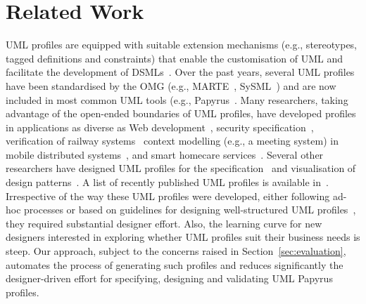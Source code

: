\section{Related Work} 
\label{sec:related}

UML profiles are equipped with suitable extension mechanisms (e.g., 
stereotypes, tagged 
definitions and constraints) that enable the customisation of UML  and 
facilitate the development of DSMLs~\cite{UML2015OMG}. 
Over the past years, several UML profiles have been standardised by the OMG 
(e.g., MARTE~\cite{omg2011marte}, SySML~\cite{friedenthal2014practical}) and 
are now included in most common UML tools (e.g., 
Papyrus~\cite{lanusse2009papyrus}. 
Many researchers, taking advantage of the open-ended boundaries of UML 
profiles, have developed profiles in applications as diverse as Web 
development~\cite{Moreno2007:IETS}, security 
specification~\cite{Bouaziz2012:ICCSE,Rodriguez2010:SERENE}, verification of 
railway systems~\cite{Bernardi2013:JRESS} context modelling (e.g., a 
meeting system) in mobile distributed systems~\cite{Simons2007:JVLC}, and smart 
homecare services~\cite{Walderhaug2009:MODELS}.
Several other researchers have designed UML profiles for the 
specification~\cite{Debnath2006:ICCSA,Mak2004:ICSE} and visualisation of 
design patterns~\cite{Dong2007:TSE}. A list of recently published UML 
profiles is available in~\cite{Pardillo2010:MODELS}. 
Irrespective of the way these UML profiles were developed, either 
following ad-hoc processes or based on guidelines for designing well-structured 
UML profiles~\cite{FuentesFernandez2004:UMLME,Selic2007:ISORC},
they required substantial designer effort. Also, the learning 
curve for new designers interested in exploring whether UML profiles suit their 
business needs is steep.
Our approach, subject to the concerns raised in Section~\ref{sec:evaluation}, 
automates the process of generating such profiles and reduces significantly the 
designer-driven effort for specifying, designing and validating UML Papyrus 
profiles. 





